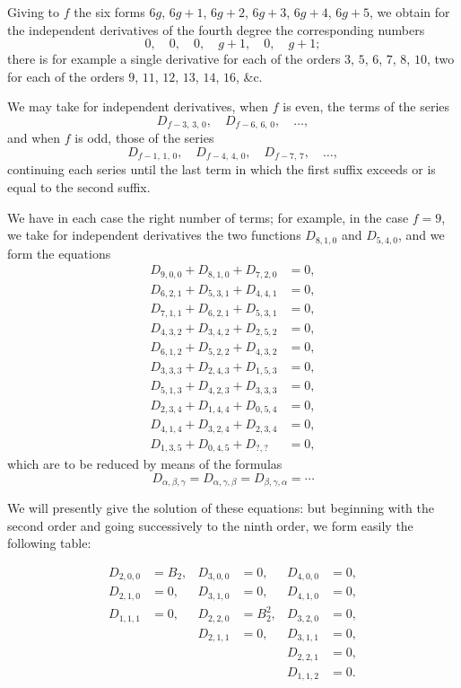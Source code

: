 \documentclass[11pt,a4paper]{book}
\begin{document}
Giving to $f$ the six forms $6g$, $6g+1$, $6g+2$, $6g+3$, $6g+4$, $6g+5$, we obtain for the independent derivatives of the fourth degree the corresponding numbers
\[
0,\quad 0,\quad 0,\quad g+1,\quad 0,\quad g+1;
\]
there is for example a single derivative for each of the orders $3$, $5$, $6$, $7$, $8$, $10$, two for each of the orders $9$, $11$, $12$, $13$, $14$, $16$, \&c.

We may take for independent derivatives, when $f$ is even, the terms of the series
\[
D_{f-3,\,3,\,0},\quad D_{f-6,\,6,\,0},\quad \ldots,
\]
and when $f$ is odd, those of the series
\[
D_{f-1,\,1,\,0},\quad D_{f-4,\,4,\,0},\quad D_{f-7,\,7},\quad \ldots,
\]
continuing each series until the last term in which the first suffix exceeds or is equal to the second suffix.

We have in each case the right number of terms; for example, in the case $f = 9$, we take for independent derivatives the two functions $D_{8,1,0}$ and $D_{5,4,0}$, and we form the equations
\begin{align*}
D_{9,0,0} + D_{8,1,0} + D_{7,2,0} &= 0,\\
D_{6,2,1} + D_{5,3,1} + D_{4,4,1} &= 0,\\
D_{7,1,1} + D_{6,2,1} + D_{5,3,1} &= 0,\\
D_{4,3,2} + D_{3,4,2} + D_{2,5,2} &= 0,\\
D_{6,1,2} + D_{5,2,2} + D_{4,3,2} &= 0,\\
D_{3,3,3} + D_{2,4,3} + D_{1,5,3} &= 0,\\
D_{5,1,3} + D_{4,2,3} + D_{3,3,3} &= 0,\\
D_{2,3,4} + D_{1,4,4} + D_{0,5,4} &= 0,\\
D_{4,1,4} + D_{3,2,4} + D_{2,3,4} &= 0,\\
D_{1,3,5} + D_{0,4,5} + D_{?,?} &= 0,
\end{align*}
which are to be reduced by means of the formulas
\[
D_{\alpha,\beta,\gamma} = D_{\alpha,\gamma,\beta} = D_{\beta,\gamma,\alpha} = \cdots
\]

We will presently give the solution of these equations: but beginning with the second order and going successively to the ninth order, we form easily the following table:

\begin{align*}
D_{2,0,0} &= B_2, & D_{3,0,0} &= 0, & D_{4,0,0} &= 0,\\
D_{2,1,0} &= 0, & D_{3,1,0} &= 0, & D_{4,1,0} &= 0,\\
D_{1,1,1} &= 0, & D_{2,2,0} &= B_2^2, & D_{3,2,0} &= 0,\\
& & D_{2,1,1} &= 0, & D_{3,1,1} &= 0,\\
& & & & D_{2,2,1} &= 0,\\
& & & & D_{1,1,2} &= 0.
\end{align*}
\end{document}
